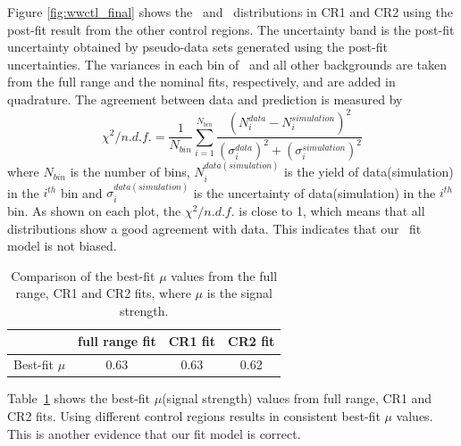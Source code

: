 Figure \ref{fig:wwctl_final} shows the \mT\ and \mll\ distributions in CR1 and CR2 using 
the post-fit result from the other control regions. 
The uncertainty band is the post-fit uncertainty obtained by pseudo-data sets 
generated using the post-fit uncertainties. 
The variances in each bin of \qqww\ and all other backgrounds 
are taken from the full range and the nominal fits, respectively, 
and are added in quadrature. 
The agreement between data and prediction is measured by
\begin{equation} 
\chi^2/n.d.f.
= \frac{1}{N_{bin}} \displaystyle \sum_{i=1}^{N_{bin}}  
  \frac{\left( N^{data}_i - N^{simulation}_i \right)^2}
       {\left( \sigma^{data}_i \right)^2 + \left( \sigma^{simulation}_i \right)^2}   
\end{equation}  
where $N_{bin}$ is the number of bins, 
$N^{data(simulation)}_i$ is the yield of data(simulation) in the $i^{th}$ bin
and $\sigma^{data(simulation)}_i$ is the uncertainty of data(simulation) 
in the $i^{th}$ bin. As shown on each plot, the $\chi^2/n.d.f.$
is close to 1, which means that all distributions show a good agreement with data.
This indicates that our \qqww\ fit model is not biased.

%
\begin{table}
\begin{center}
\label{tab:bestfitmu_compare}
\vspace{0.5cm} 
\caption{Comparison of the best-fit $\mu$ values from the full range, CR1 and CR2 fits, 
where $\mu$ is the signal strength.} 
\vspace{0.5cm} 
\begin{tabular}{c|ccc}
\hline
                    & full range fit    & CR1 fit   & CR2 fit   \\
\hline \hline
Best-fit $\mu$      & 0.63              & 0.63      & 0.62      \\
\hline
\end{tabular}
\end{center}
\end{table}

Table~\ref{tab:bestfitmu_compare} shows the best-fit $\mu$(signal strength) 
values from full range, CR1 and CR2 fits. 
Using different control regions results in consistent best-fit $\mu$ values. 
This is another evidence that our fit model is correct. 

